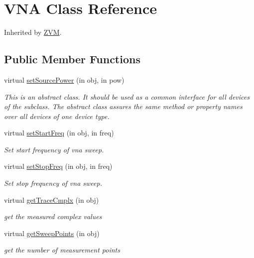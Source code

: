 \hypertarget{class_v_n_a}{}\section{V\+NA Class Reference}
\label{class_v_n_a}


Inherited by \hyperlink{class_z_v_m}{Z\+VM}.

\subsection*{Public Member Functions}
\begin{DoxyCompactItemize}
\item 
virtual \hyperlink{class_v_n_a_a39b615b1dfaf603a9d764c33a0af9619}{set\+Source\+Power} (in obj, in pow)
\begin{DoxyCompactList}\small\item\em This is an abstract class. It should be used as a common interface for all devices of the subclass. The abstract class assures the same method or property names over all devices of one device type. \end{DoxyCompactList}\item 
virtual \hyperlink{class_v_n_a_ae6a7b1356fa26125f6ec6fe53fffe162}{set\+Start\+Freq} (in obj, in freq)
\begin{DoxyCompactList}\small\item\em Set start frequency of vna sweep. \end{DoxyCompactList}\item 
virtual \hyperlink{class_v_n_a_a7b32c49632ee768c054f3eb2ca068db3}{set\+Stop\+Freq} (in obj, in freq)
\begin{DoxyCompactList}\small\item\em Set stop frequency of vna sweep. \end{DoxyCompactList}\item 
virtual \hyperlink{class_v_n_a_a4a1d8a6effb259704c806981f70ae3f2}{get\+Trace\+Cmplx} (in obj)
\begin{DoxyCompactList}\small\item\em get the measured complex values \end{DoxyCompactList}\item 
virtual \hyperlink{class_v_n_a_a0712bc3c82b115205dec4ae2bfe199c6}{get\+Sweep\+Points} (in obj)
\begin{DoxyCompactList}\small\item\em get the number of measurement points \end{DoxyCompactList}\item 

\end{DoxyCompactItemize}
